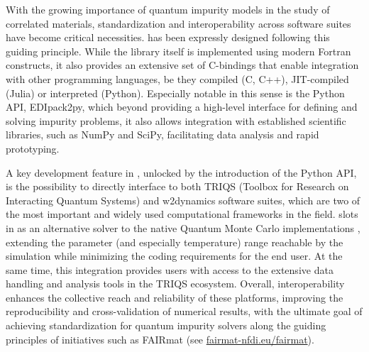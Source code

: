 \documentclass[edipack_sp.tex]{subfiles}
\begin{document}
With the growing importance of quantum impurity models in the study of correlated materials, standardization and interoperability across software suites have become critical necessities.
\NAME has been expressly designed following this guiding principle. 
While the library itself is implemented using modern Fortran constructs, it also provides an extensive set of C-bindings that enable integration with other programming languages,
be they compiled (C, C++), JIT-compiled (Julia) or interpreted (Python).  
Especially notable in this sense is the Python API, EDIpack2py, which beyond providing a 
high-level interface for defining and solving impurity problems, it also allows integration with established scientific libraries, such as NumPy and SciPy, facilitating data analysis and
rapid prototyping. 

A key development feature in \NAME, unlocked by the introduction of the Python API, 
is the possibility to directly interface to both TRIQS \cite{Parcollet2015CPC} (Toolbox for Research on Interacting Quantum Systems) and
w2dynamics \cite{Wallerberger2019CPC} software suites, which are two of the most important and widely used computational frameworks in the field.
\NAME slots in as an alternative solver to the native Quantum Monte Carlo 
implementations \cite{Gull2011RMP,Seth2016CPC}, extending the parameter (and especially temperature) range reachable by 
the simulation while minimizing the coding requirements for the end user.
At the same time, this integration provides \NAME users with access to the
extensive data handling and analysis tools in the TRIQS ecosystem. 
Overall, interoperability enhances the collective reach and reliability of these platforms, 
improving the reproducibility and cross-validation of numerical results, with the ultimate goal of achieving standardization for quantum impurity solvers along the guiding principles of initiatives such as FAIRmat (see \href{https://www.fairmat-nfdi.eu/fairmat/}{fairmat-nfdi.eu/fairmat}). 
\end{document}
